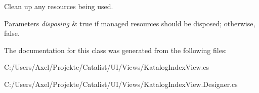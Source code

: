 Clean up any resources being used. 


\begin{DoxyParams}{Parameters}
{\em disposing} & true if managed resources should be disposed; otherwise, false.\\
\hline
\end{DoxyParams}


The documentation for this class was generated from the following files\+:\begin{DoxyCompactItemize}
\item 
C\+:/\+Users/\+Axel/\+Projekte/\+Catalist/\+U\+I/\+Views/Katalog\+Index\+View.\+cs\item 
C\+:/\+Users/\+Axel/\+Projekte/\+Catalist/\+U\+I/\+Views/Katalog\+Index\+View.\+Designer.\+cs\end{DoxyCompactItemize}
